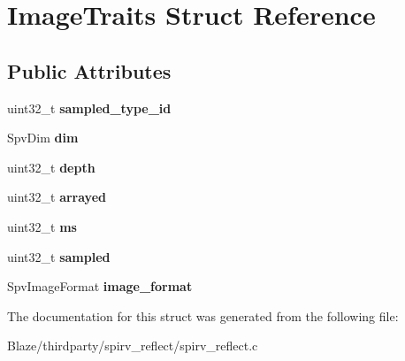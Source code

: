 \hypertarget{structImageTraits}{}\section{Image\+Traits Struct Reference}
\label{structImageTraits}
\subsection*{Public Attributes}
\begin{DoxyCompactItemize}
\item 
\mbox{\label{structImageTraits_a1fe83c1d1413557ea1a8b4d628a31640}} 
uint32\+\_\+t {\bfseries sampled\+\_\+type\+\_\+id}
\item 
\mbox{\label{structImageTraits_a3167e4abbc3ff8e45321d0f1199594c2}} 
Spv\+Dim {\bfseries dim}
\item 
\mbox{\label{structImageTraits_a0eaa8b65132e65b2031d4de530220a0d}} 
uint32\+\_\+t {\bfseries depth}
\item 
\mbox{\label{structImageTraits_acf94455c24c3db652a5721cb47bb8f15}} 
uint32\+\_\+t {\bfseries arrayed}
\item 
\mbox{\label{structImageTraits_a3f6e0add7973ae6f0c0cf184fcd12354}} 
uint32\+\_\+t {\bfseries ms}
\item 
\mbox{\label{structImageTraits_a4491ebc3a53b51049236e4d639138780}} 
uint32\+\_\+t {\bfseries sampled}
\item 
\mbox{\label{structImageTraits_a46e2df70394bb5ed91f3be5c5c2fe314}} 
Spv\+Image\+Format {\bfseries image\+\_\+format}
\end{DoxyCompactItemize}


The documentation for this struct was generated from the following file\+:\begin{DoxyCompactItemize}
\item 
Blaze/thirdparty/spirv\+\_\+reflect/spirv\+\_\+reflect.\+c\end{DoxyCompactItemize}

